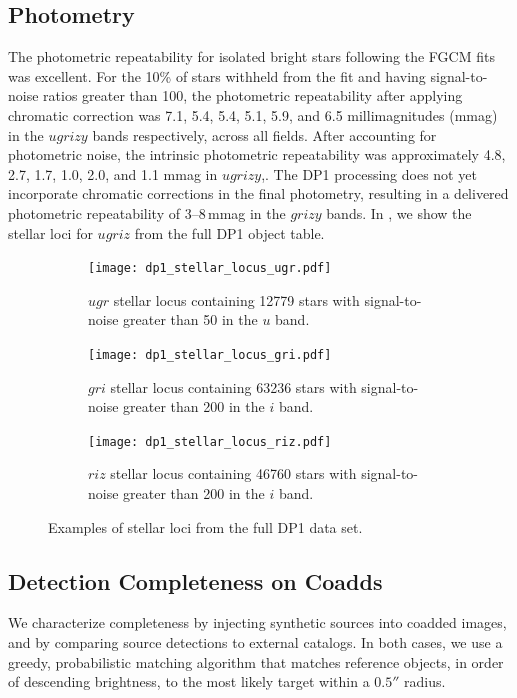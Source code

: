 \subsection{Photometry}
The photometric repeatability for isolated bright stars following the \gls{FGCM} fits was excellent. 
For the 10\% of stars withheld from the fit and having signal-to-noise ratios greater than 100, the photometric repeatability after applying chromatic correction was 7.1, 5.4, 5.4, 5.1, 5.9, and 6.5 millimagnitudes (mmag) in the $ugrizy$ bands respectively, across all fields.
After accounting for photometric noise, the intrinsic photometric repeatability was approximately 4.8, 2.7, 1.7, 1.0, 2.0, and 1.1 mmag in $ugrizy$,.
The DP1 processing does not yet incorporate chromatic corrections in the final photometry, resulting in a delivered photometric repeatability of 3–8 mmag in the $grizy$ bands.
In , we show the stellar loci for $ugriz$ from the full DP1 object table.
\begin{figure}[hbt!]
  \centering
  \begin{subfigure}[t]{0.31\textwidth}
  \texttt{[image: dp1\_stellar\_locus\_ugr.pdf]}
  \caption{$ugr$ stellar locus containing 12779 stars with signal-to-noise greater than 50 in the $u$ band.}
  \end{subfigure}\hfill
  \begin{subfigure}[t]{0.31\textwidth}
  \texttt{[image: dp1\_stellar\_locus\_gri.pdf]}
  \caption{$gri$ stellar locus containing 63236 stars with signal-to-noise greater than 200 in the $i$ band.}
  \end{subfigure}\hfill
    \begin{subfigure}[t]{0.31\textwidth}
  \texttt{[image: dp1\_stellar\_locus\_riz.pdf]}
  \caption{$riz$ stellar locus containing 46760 stars with signal-to-noise greater than 200 in the $i$ band.}
  \end{subfigure}\hfill
\caption{Examples of stellar loci from the full DP1 data set.}
  \label{fig:stellarloci}
\end{figure}

\subsection{Detection Completeness on Coadds}
\label{ssec:detection_completeness}
We characterize completeness by injecting synthetic sources into coadded images, and by comparing source detections to external catalogs.
In both cases, we use a greedy, probabilistic matching \gls{algorithm} that matches reference objects, in order of descending brightness, to the most likely target within a $0.5''$ radius.

